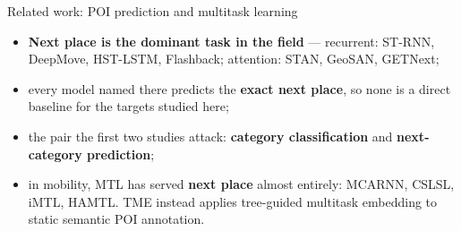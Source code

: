 \documentclass{beamer}
\begin{document}
\begin{frame}{Related work: POI prediction and multitask learning}
    \begin{itemize}\setlength{\itemsep}{5pt}
        \item \textbf{Next place is the dominant task in the field} --- recurrent: ST-RNN,
              DeepMove, HST-LSTM, Flashback; attention: STAN, GeoSAN, GETNext;
        \item every model named there predicts the \textbf{exact next place}, so
              \alert{none is a direct baseline for the targets studied here};
        \item the pair the first two studies attack: \textbf{category classification} and
              \textbf{next-category prediction};
        \item in mobility, MTL has served \textbf{next place} almost entirely: MCARNN, CSLSL,
              iMTL, HAMTL. TME instead applies tree-guided multitask embedding to static
              semantic POI annotation.
    \end{itemize}
\end{frame}
\end{document}
